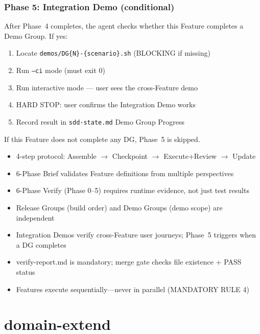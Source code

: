 \documentclass[11pt,a4paper,openright,twoside]{report}
\newcommand{\file}[1]{\texttt{#1}}
\begin{document}
\subsection{Phase 5: Integration Demo (conditional)}

After Phase~4 completes, the agent checks whether this Feature completes a Demo Group. If yes:
\begin{enumerate}[nosep]
  \item Locate \file{demos/DG\{N\}-\{scenario\}.sh} (BLOCKING if missing)
  \item Run \texttt{--ci} mode (must exit 0)
  \item Run interactive mode --- user sees the cross-Feature demo
  \item HARD STOP: user confirms the Integration Demo works
  \item Record result in \file{sdd-state.md} Demo Group Progress
\end{enumerate}
If this Feature does not complete any DG, Phase~5 is skipped.

\begin{tipbox}
\begin{itemize}[nosep]
  \item 4-step protocol: Assemble $\rightarrow$ Checkpoint $\rightarrow$ Execute+Review $\rightarrow$ Update
  \item 6-Phase Brief validates Feature definitions from multiple perspectives
  \item 6-Phase Verify (Phase 0--5) requires runtime evidence, not just test results
  \item Release Groups (build order) and Demo Groups (demo scope) are independent
  \item Integration Demos verify cross-Feature user journeys; Phase~5 triggers when a DG completes
  \item verify-report.md is mandatory; merge gate checks file existence + PASS status
  \item Features execute sequentially---never in parallel (MANDATORY RULE 4)
\end{itemize}
\end{tipbox}


\chapter{domain-extend}
\label{ch:domain-extend}
\end{document}
